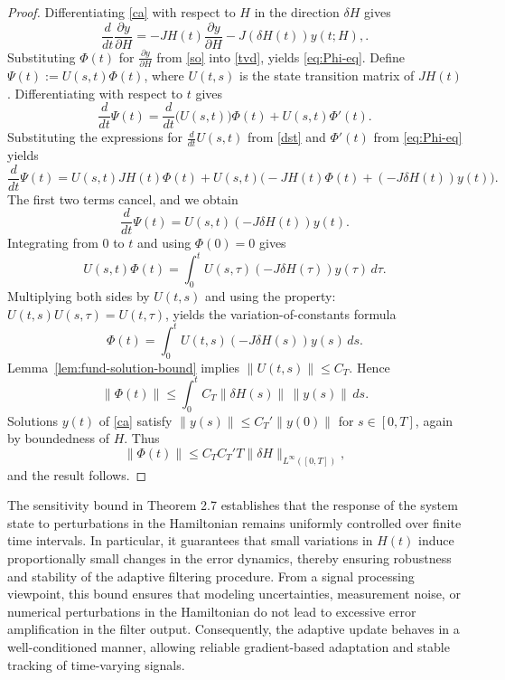 \documentclass[reqno]{amsart}
\numberwithin{equation}{section}
\begin{document}
\begin{proof}
Differentiating \eqref{ca} with respect to $H$ in the direction 
$\delta H$ gives
\begin{equation} \label{tvd}
    \frac{d}{dt} \frac{\partial y}{\partial H}
    = -JH(t)\frac{\partial y}{\partial H}
     -J (\delta H(t)) y(t;H),
. \end{equation} Substituting $ \Phi(t) $ for $\frac{\partial y}{ \partial H} $ from \eqref{so} into \eqref{tvd}, yields \eqref{eq:Phi-eq}.  
Define $\Psi(t):=U(s,t)\Phi(t)$, where $U(t,s)$ is the state transition matrix of $JH(t)$. Differentiating with respect to $t$ gives
\begin{equation} \label{2.39}
\frac{d}{dt}\Psi(t)
= \frac{d}{dt}\big(U(s,t)\big)\Phi(t)+U(s,t)\Phi'(t).
\end{equation}
Substituting the expressions for $\frac{d}{dt}U(s,t)$ from \eqref{dst} and $\Phi'(t)$ from \eqref{eq:Phi-eq} yields
\begin{equation}
\frac{d}{dt}\Psi(t)
= U(s,t)JH(t)\Phi(t)
+U(s,t)\big(-JH(t)\Phi(t)+(-J\delta H(t))y(t)\big).
\end{equation}
The first two terms cancel, and we obtain
\[
\frac{d}{dt}\Psi(t)=U(s,t)(-J\delta H(t))y(t).
\] Integrating from $0$ to $t$ and using $\Phi(0)=0$ gives
\[
U(s,t)\Phi(t)
=\int_0^t U(s,\tau)(-J\delta H(\tau))y(\tau)\,d\tau.
\]
Multiplying both sides by $U(t,s)$  and using the property: $ U(t,s)U(s,\tau)= U(t, \tau)$, yields the variation-of-constants formula
\[
\Phi(t)=\int_0^t U(t,s)(-J\delta H(s))y(s)\,ds.
\]
 Lemma~\ref{lem:fund-solution-bound} implies $\|U(t,s)\|\le C_T$.  
Hence
\[
    \|\Phi(t)\|
    \le \int_0^t C_T \|\delta H(s)\|\, \|y(s)\| \, ds.
\]
Solutions $y(t)$ of \eqref{ca} satisfy 
$\|y(s)\|\le C_T' \|y(0)\|$ for $s\in[0,T]$, 
again by boundedness of $H$.  
Thus
\[
    \|\Phi(t)\|
    \le C_T C_T' T \|\delta H\|_{L^\infty([0,T])},
\]
and the result follows.
\end{proof}
The sensitivity bound in Theorem 2.7 establishes that the response of the system state to perturbations in the Hamiltonian remains uniformly controlled over finite time intervals. In particular, it guarantees that small variations in $H(t)$ induce proportionally small changes in the error dynamics, thereby ensuring robustness and stability of the adaptive filtering procedure. From a signal processing viewpoint, this bound ensures that modeling uncertainties, measurement noise, or numerical perturbations in the Hamiltonian do not lead to excessive error amplification in the filter output. Consequently, the adaptive update behaves in a well-conditioned manner, allowing reliable gradient-based adaptation and stable tracking of time-varying signals.
\end{document}
